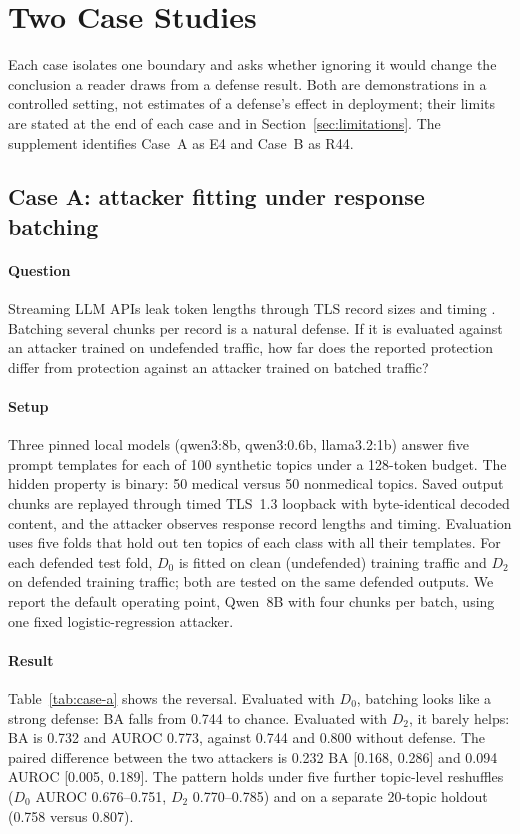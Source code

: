 \section{Two Case Studies}\label{sec:cases}\label{sec:discussion}
Each case isolates one boundary and asks whether ignoring it would change the conclusion a reader draws from a defense result. Both are demonstrations in a controlled setting, not estimates of a defense's effect in deployment; their limits are stated at the end of each case and in Section~\ref{sec:limitations}. The supplement identifies Case~A as E4 and Case~B as R44.

\subsection{Case A: attacker fitting under response batching}\label{sec:case-a}
\paragraph{Question}
Streaming LLM APIs leak token lengths through TLS record sizes and timing \cite{whisperleak2025,netecho2025}. Batching several chunks per record is a natural defense. If it is evaluated against an attacker trained on undefended traffic, how far does the reported protection differ from protection against an attacker trained on batched traffic?

\paragraph{Setup}
Three pinned local models (qwen3:8b, qwen3:0.6b, llama3.2:1b) answer five prompt templates for each of 100 synthetic topics under a 128-token budget. The hidden property is binary: 50 medical versus 50 nonmedical topics. Saved output chunks are replayed through timed TLS~1.3 loopback with byte-identical decoded content, and the attacker observes response record lengths and timing. Evaluation uses five folds that hold out ten topics of each class with all their templates. For each defended test fold, $D_0$ is fitted on clean (undefended) training traffic and $D_2$ on defended training traffic; both are tested on the same defended outputs. We report the default operating point, Qwen~8B with four chunks per batch, using one fixed logistic-regression attacker.



\paragraph{Result}
Table~\ref{tab:case-a} shows the reversal. Evaluated with $D_0$, batching looks like a strong defense: BA falls from 0.744 to chance. Evaluated with $D_2$, it barely helps: BA is 0.732 and AUROC 0.773, against 0.744 and 0.800 without defense. The paired difference between the two attackers is 0.232 BA [0.168, 0.286] and 0.094 AUROC [0.005, 0.189]. The pattern holds under five further topic-level reshuffles ($D_0$ AUROC 0.676--0.751, $D_2$ 0.770--0.785) and on a separate 20-topic holdout (0.758 versus 0.807).


